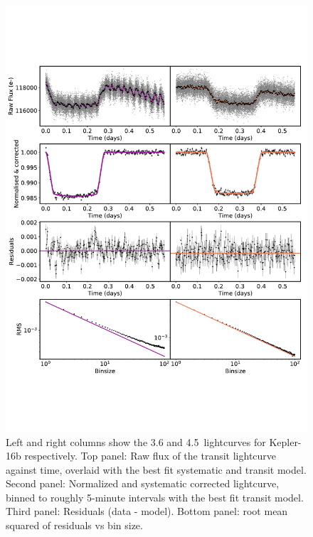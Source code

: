 \begin{figure}
    \centering
    \includegraphics[width = \linewidth, trim={0 4cm 0 4cm},clip]{Kepler16b_lc.pdf}
    \caption{Left and right columns show the 3.6 and 4.5\um~\spitzerIRAC lightcurves for Kepler-16b respectively. Top panel: Raw flux of the transit lightcurve against time, overlaid with the best fit systematic and transit model. Second panel: Normalized and systematic corrected lightcurve, binned to roughly 5-minute intervals with the best fit transit model. Third panel: Residuals (data - model). Bottom panel: root mean squared of residuals vs bin size.}
    \label{P4:fig:k16blc}
\end{figure}

